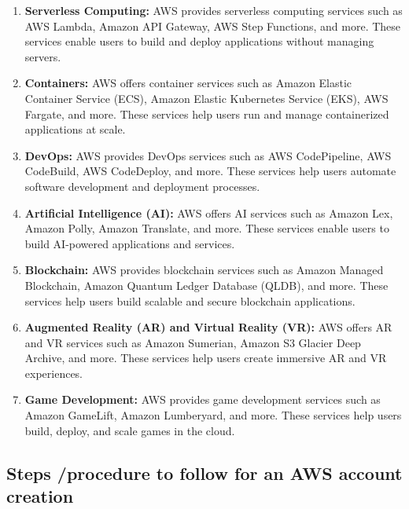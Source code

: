 \documentclass[11pt]{article}
\begin{document}
\begin{enumerate}
    \item \textbf{Serverless Computing:} AWS provides serverless computing services such as AWS Lambda, Amazon API Gateway, AWS Step Functions, and more. These services enable users to build and deploy applications without managing servers.
    \item \textbf{Containers:} AWS offers container services such as Amazon Elastic Container Service (ECS), Amazon Elastic Kubernetes Service (EKS), AWS Fargate, and more. These services help users run and manage containerized applications at scale.
    \item \textbf{DevOps:} AWS provides DevOps services such as AWS CodePipeline, AWS CodeBuild, AWS CodeDeploy, and more. These services help users automate software development and deployment processes.
    \item \textbf{Artificial Intelligence (AI):} AWS offers AI services such as Amazon Lex, Amazon Polly, Amazon Translate, and more. These services enable users to build AI-powered applications and services.
    \item \textbf{Blockchain:} AWS provides blockchain services such as Amazon Managed Blockchain, Amazon Quantum Ledger Database (QLDB), and more. These services help users build scalable and secure blockchain applications.
    \item \textbf{Augmented Reality (AR) and Virtual Reality (VR):} AWS offers AR and VR services such as Amazon Sumerian, Amazon S3 Glacier Deep Archive, and more. These services help users create immersive AR and VR experiences.
    \item \textbf{Game Development:} AWS provides game development services such as Amazon GameLift, Amazon Lumberyard, and more. These services help users build, deploy, and scale games in the cloud.
\end{enumerate}

\subsection{Steps /procedure to follow for an AWS account creation}
\end{document}
